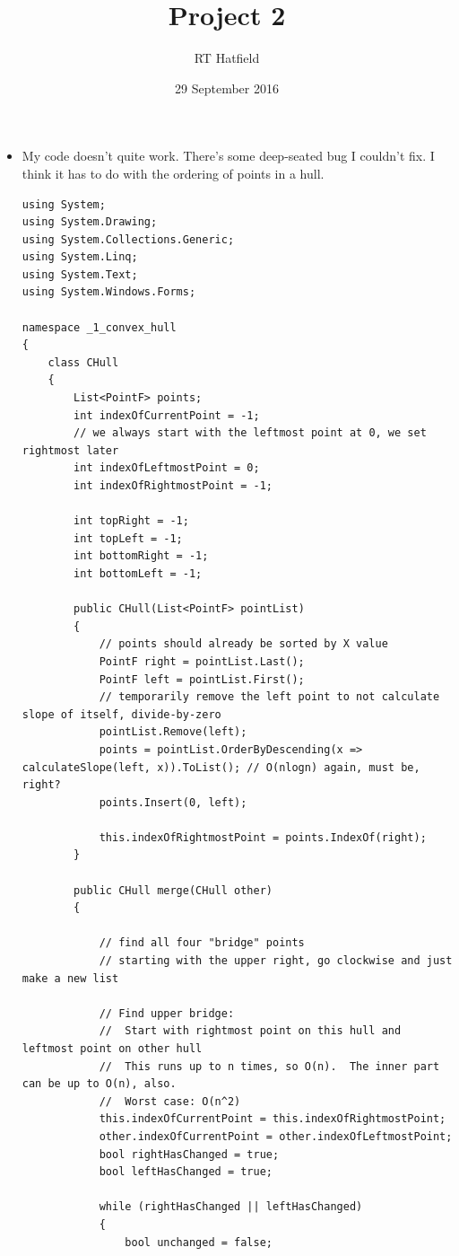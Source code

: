 \documentclass{article}
\title{Project 2}
\author{RT Hatfield}
\date{29 September 2016}
\begin{document}
\maketitle
\begin{itemize}
    \item My code doesn't quite work.  There's some deep-seated bug I couldn't fix.  I think it has to do with 
    the ordering of points in a hull.
    \begin{lstlisting}
using System;
using System.Drawing;
using System.Collections.Generic;
using System.Linq;
using System.Text;
using System.Windows.Forms;

namespace _1_convex_hull
{
    class CHull
    {
        List<PointF> points;
        int indexOfCurrentPoint = -1;
        // we always start with the leftmost point at 0, we set rightmost later
        int indexOfLeftmostPoint = 0;
        int indexOfRightmostPoint = -1;

        int topRight = -1;
        int topLeft = -1;
        int bottomRight = -1;
        int bottomLeft = -1;

        public CHull(List<PointF> pointList)
        {
            // points should already be sorted by X value
            PointF right = pointList.Last();
            PointF left = pointList.First();
            // temporarily remove the left point to not calculate slope of itself, divide-by-zero
            pointList.Remove(left);
            points = pointList.OrderByDescending(x => calculateSlope(left, x)).ToList(); // O(nlogn) again, must be, right?
            points.Insert(0, left);

            this.indexOfRightmostPoint = points.IndexOf(right);
        }

        public CHull merge(CHull other)
        {
 
            // find all four "bridge" points
            // starting with the upper right, go clockwise and just make a new list

            // Find upper bridge:
            //  Start with rightmost point on this hull and leftmost point on other hull
            //  This runs up to n times, so O(n).  The inner part can be up to O(n), also.
            //  Worst case: O(n^2)
            this.indexOfCurrentPoint = this.indexOfRightmostPoint;
            other.indexOfCurrentPoint = other.indexOfLeftmostPoint;
            bool rightHasChanged = true;
            bool leftHasChanged = true;
            
            while (rightHasChanged || leftHasChanged) 
            {
                bool unchanged = false;


\end{lstlisting}
\end{itemize}
\end{document}
